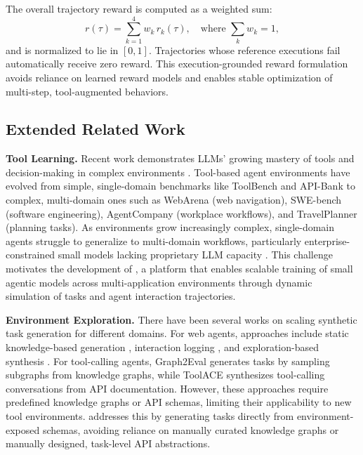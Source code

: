 \documentclass{article}
\theoremstyle{plain}
\theoremstyle{definition}
\theoremstyle{remark}
\begin{document}
The overall trajectory reward is computed as a weighted sum:
\[
r(\tau) = \sum_{k=1}^{4} w_k \, r_k(\tau), \quad \text{where } \sum_k w_k = 1,
\]
and is normalized to lie in $[0,1]$. Trajectories whose reference executions fail automatically receive zero reward. This execution-grounded reward formulation avoids reliance on learned reward models and enables stable optimization of multi-step, tool-augmented behaviors.



\subsection{Extended Related Work}
\label{app:extended_related_work}
\vspace{-0.2cm}
\textbf{Tool Learning.} Recent work demonstrates LLMs' growing mastery of tools and decision-making in complex environments \cite{qintoolllm, qian2023toolalpaca, liutoolace, schick2023toolformer, qu2024exploration}. Tool-based agent environments have evolved from simple, single-domain benchmarks like ToolBench \cite{qintoolllm} and API-Bank \cite{li2023api} to complex, multi-domain ones such as WebArena \cite{zhouwebarena} (web navigation), SWE-bench \cite{yangswe} (software engineering), AgentCompany \cite{xu2024theagentcompany} (workplace workflows), and TravelPlanner \cite{xie2024travelplanner} (planning tasks). As environments grow increasingly complex, single-domain agents struggle to generalize to multi-domain workflows, particularly enterprise-constrained small models lacking proprietary LLM capacity \cite{shen2024small, manduzio2024improving}. This challenge motivates the development of \name{}, a platform that enables scalable training of small agentic models across multi-application environments through dynamic simulation of tasks and agent interaction trajectories.

\textbf{Environment Exploration.}
There have been several works on scaling synthetic task generation for different domains. For web agents, approaches include static knowledge-based generation \cite{ou2024synatra}, interaction logging \cite{lai2024autowebglm, murty2024bagel}, and exploration-based synthesis \cite{murty2024nnetnav, gandhi2025go, sun2025genesis, ramrakhya2025scaling}. For tool-calling agents, Graph2Eval \cite{chen2025graph2eval} generates tasks by sampling subgraphs from knowledge graphs, while ToolACE \cite{liutoolace} synthesizes tool-calling conversations from API documentation. However, these approaches require predefined knowledge graphs or API schemas, limiting their applicability to new tool environments. \name{} addresses this by generating tasks directly from environment-exposed schemas, avoiding reliance on manually curated knowledge graphs or manually designed, task-level API abstractions.
\end{document}

